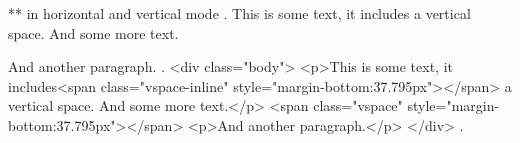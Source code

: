 ** \vspace{} in horizontal and vertical mode
.
This is some text, it includes\vspace{1cm} a vertical space. And some more text.

\vspace{1cm}
And another paragraph.
.
<div class="body">
<p>This is some text, it includes<span class="vspace-inline" style="margin-bottom:37.795px"></span> a vertical space. And some more text.</p>
<span class="vspace" style="margin-bottom:37.795px"></span>
<p>And another paragraph.</p>
</div>
.
